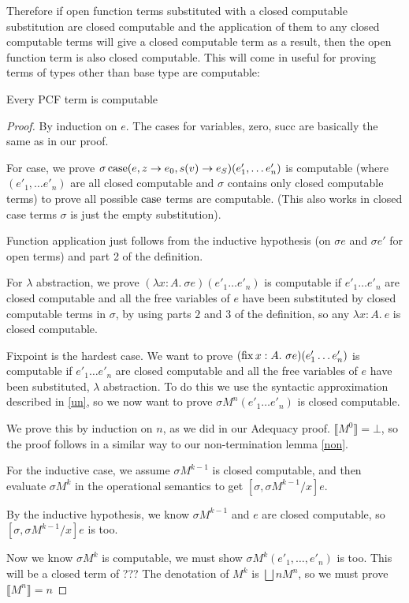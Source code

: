 Therefore if open function terms substituted with a closed computable substitution are closed computable and the application of them to any closed computable terms will give a closed computable term as a result, then the open function term is also closed computable. This will come in useful for proving terms of types other than base type are computable:

\vspace{0.5cm}

\begin{thm}
Every PCF term is computable
\end{thm}

\begin{proof}
By induction on $e$. The cases for variables, zero, succ are basically the same as in our proof.

For case, we prove $\sigma \operatorname{case}(e, z \to e_0, s(v) \to e_S)(e'_1, \dots e'_n)$ is computable (where $(e'_1, \dots e'_n)$ are all closed  computable and $\sigma$ contains only closed computable terms) to prove all possible $\operatorname{case}$ terms are computable. (This also works in closed case terms $\sigma$ is just the empty substitution).  

Function application just follows from the inductive hypothesis (on $\sigma e$ and $\sigma e'$ for open terms) and part 2 of the definition.

For $\lambda$ abstraction, we prove $(\lambda x:A. \ \sigma e)(e'_1 \dots e'_n)$ is computable if $e'_1 \dots e'_n$ are closed computable and all the free variables of $e$ have been substituted by closed computable terms in $\sigma$, by using parts $2$ and $3$ of the definition, so   any $\lambda x:A. \ e$ is closed computable.

Fixpoint is the hardest case. We want to prove $(\operatorname{fix} x:A. \ \sigma e)(e'_1 \dots e'_n)$ is computable if $e'_1 \dots e'_n$ are closed computable and all the free variables of $e$ have been substituted, $\lambda$ abstraction. To do this we use the syntactic approximation described in \ref{un}, so we now want to prove $\sigma M^n (e'_1 \dots e'_n)$ is closed computable.

We prove this by induction on $n$, as we did in our Adequacy proof. $\llbracket M^0 \rrbracket = \bot$, so the proof follows in a similar way to our non-termination lemma \ref{non}.

For the inductive case, we assume $\sigma M^{k-1}$ is closed computable, and then evaluate $\sigma M^k$ in the operational semantics to get $[\sigma, \sigma M^{k-1}/x]e$.

By the inductive hypothesis, we know $\sigma  M^{k-1}$ and $e$ are closed computable, so    $[\sigma, \sigma M^{k-1}/x]e$ is too.

Now we know $\sigma M^k$ is computable, we must show $\sigma M^k (e'_1, \dots, e'_n)$ is too. This will be a closed term of ??? The denotation of $M^k$ is $\bigsqcup n M^n$, so we must prove $\llbracket M^n \rrbracket = n$
\end{proof}

